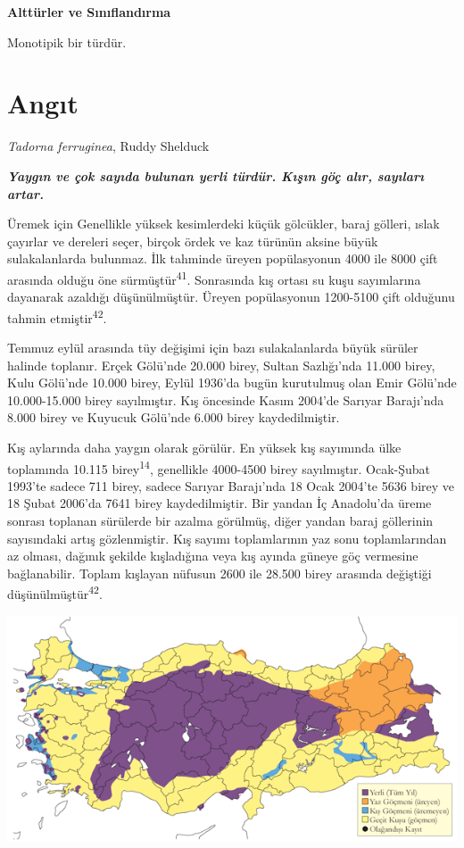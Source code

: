 \documentclass[
  letterpaper,
  DIV=11,
  numbers=noendperiod]{scrreprt}
\begin{document}
\textbf{Alttürler ve Sınıflandırma}

Monotipik bir türdür.

\section{Angıt}\label{angux131t}

\emph{Tadorna ferruginea}, Ruddy Shelduck

\textbf{\emph{Yaygın ve çok sayıda bulunan yerli türdür. Kışın göç alır,
sayıları artar.}}

Üremek için Genellikle yüksek kesimlerdeki küçük gölcükler, baraj
gölleri, ıslak çayırlar ve dereleri seçer, birçok ördek ve kaz türünün
aksine büyük sulakalanlarda bulunmaz. İlk tahminde üreyen popülasyonun
4000 ile 8000 çift arasında olduğu öne sürmüştür\textsuperscript{41}.
Sonrasında kış ortası su kuşu sayımlarına dayanarak azaldığı
düşünülmüştür. Üreyen popülasyonun 1200-5100 çift olduğunu tahmin
etmiştir\textsuperscript{42}.

Temmuz eylül arasında tüy değişimi için bazı sulakalanlarda büyük
sürüler halinde toplanır. Erçek Gölü'nde 20.000 birey, Sultan
Sazlığı'nda 11.000 birey, Kulu Gölü'nde 10.000 birey, Eylül 1936'da
bugün kurutulmuş olan Emir Gölü'nde 10.000-15.000 birey sayılmıştır. Kış
öncesinde Kasım 2004'de Sarıyar Barajı'nda 8.000 birey ve Kuyucuk
Gölü'nde 6.000 birey kaydedilmiştir.

Kış aylarında daha yaygın olarak görülür. En yüksek kış sayımında ülke
toplamında 10.115 birey\textsuperscript{14}, genellikle 4000-4500 birey
sayılmıştır. Ocak-Şubat 1993'te sadece 711 birey, sadece Sarıyar
Barajı'nda 18 Ocak 2004'te 5636 birey ve 18 Şubat 2006'da 7641 birey
kaydedilmiştir. Bir yandan İç Anadolu'da üreme sonrası toplanan
sürülerde bir azalma görülmüş, diğer yandan baraj göllerinin sayısındaki
artış gözlenmiştir. Kış sayımı toplamlarının yaz sonu toplamlarından az
olması, dağınık şekilde kışladığına veya kış ayında güneye göç vermesine
bağlanabilir. Toplam kışlayan nüfusun 2600 ile 28.500 birey arasında
değiştiği düşünülmüştür\textsuperscript{42}.

\includegraphics{images/harita_Page_013.png}
\end{document}
